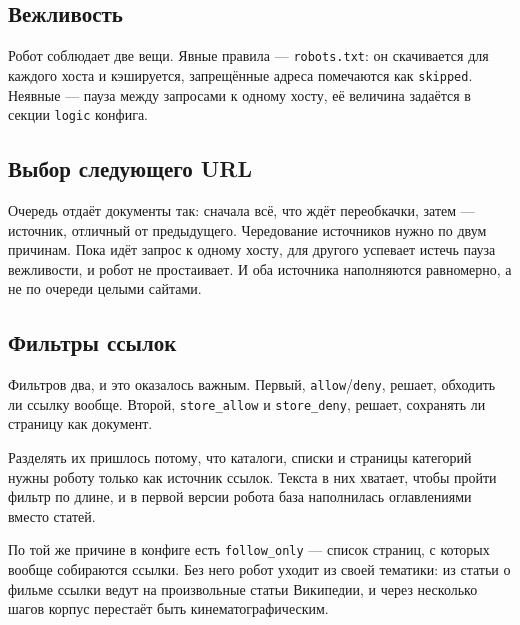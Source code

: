 \subsection*{Вежливость}

Робот соблюдает две вещи. Явные правила --- \texttt{robots.txt}: он скачивается
для каждого хоста и кэшируется, запрещённые адреса помечаются как
\texttt{skipped}. Неявные --- пауза между запросами к одному хосту, её величина
задаётся в секции \texttt{logic} конфига.

\subsection*{Выбор следующего URL}

Очередь отдаёт документы так: сначала всё, что ждёт переобкачки, затем ---
источник, отличный от предыдущего. Чередование источников нужно по двум
причинам. Пока идёт запрос к одному хосту, для другого успевает истечь пауза
вежливости, и робот не простаивает. И оба источника наполняются равномерно, а не
по очереди целыми сайтами.

\subsection*{Фильтры ссылок}

Фильтров два, и это оказалось важным. Первый, \texttt{allow}/\texttt{deny},
решает, обходить ли ссылку вообще. Второй, \texttt{store\_allow} и
\texttt{store\_deny}, решает, сохранять ли страницу как документ.

Разделять их пришлось потому, что каталоги, списки и страницы категорий нужны
роботу только как источник ссылок. Текста в них хватает, чтобы пройти фильтр по
длине, и в первой версии робота база наполнилась оглавлениями вместо статей.

По той же причине в конфиге есть \texttt{follow\_only} --- список страниц, с
которых вообще собираются ссылки. Без него робот уходит из своей тематики: из
статьи о фильме ссылки ведут на произвольные статьи Википедии, и через несколько
шагов корпус перестаёт быть кинематографическим.

\pagebreak
